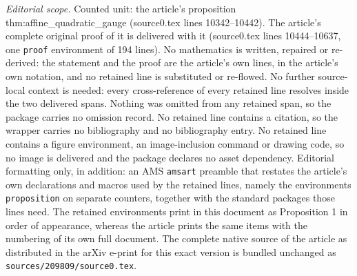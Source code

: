 \documentclass[10pt,a4paper]{amsart}
\begin{document}
\noindent\textit{Editorial scope.} Counted unit: the article's proposition thm:affine\_quadratic\_gauge (source0.tex lines 10342--10442). The article's complete original proof of it is delivered with it (source0.tex lines 10444--10637, one \texttt{proof} environment of 194 lines). No mathematics is written, repaired or re-derived: the statement and the proof are the article's own lines, in the article's own notation, and no retained line is substituted or re-flowed.  No further source-local context is needed: every cross-reference of every retained line resolves inside the two delivered spans.  Nothing was omitted from any retained span, so the package carries no omission record.  No retained line contains a citation, so the wrapper carries no bibliography and no bibliography entry.  No retained line contains a figure environment, an image-inclusion command or drawing code, so no image is delivered and the package declares no asset dependency.  Editorial formatting only, in addition: an AMS \texttt{amsart} preamble that restates the article's own declarations and macros used by the retained lines, namely the environments \texttt{proposition} on separate counters, together with the standard packages those lines need.  The retained environments print in this document as Proposition 1 in order of appearance, whereas the article prints the same items with the numbering of its own full document.  The complete native source of the article as distributed in the arXiv e-print for this exact version is bundled unchanged as \texttt{sources/209809/source0.tex}.
\end{document}
